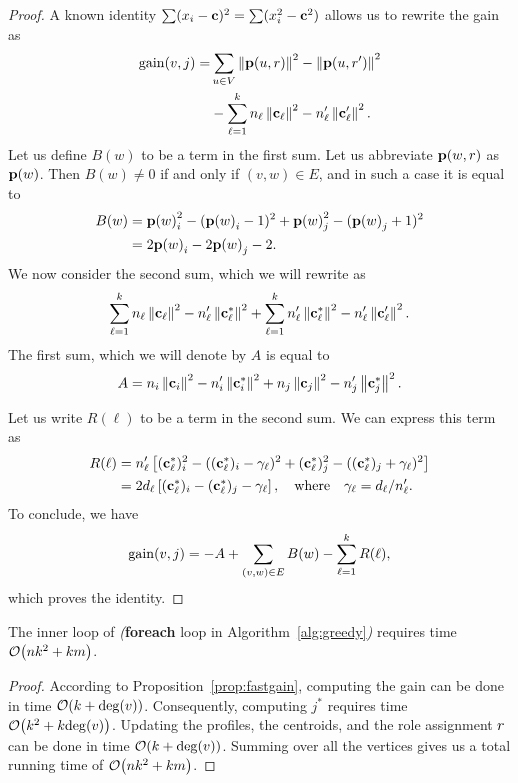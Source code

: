 \begin{proof}
A known identity $\sum (x_i - \mathbf{c})^2 = \sum (x_i^2 - \mathbf{c}^2)$ allows us to 
rewrite the gain as
\[
\begin{split}
	\gain{v, j} = & \sum_{u \in V} \norm{\prof{u, \role}}^2 -  \norm{\prof{u, \role'}}^2 \\
	& - \sum_{\ell = 1}^k n_\ell \norm{\centroid_\ell}^2 -  n_\ell' \norm{\centroid_\ell'}^2.
\end{split}
\]
Let us define $B(w)$ to be a term in the first sum.
Let us abbreviate $\prof{w, \role}$ as $\prof{w}$.
Then $B(w) \neq 0$ if and only if $(v, w) \in E$,
and in such a case it is equal to
\[
\begin{split}
	B(w) & = \prof{w}_i^2 - (\prof{w}_i - 1)^2 + \prof{w}_j^2 - (\prof{w}_j + 1)^2 \\
	& = 2\prof{w}_i - 2\prof{w}_j  - 2.
\end{split}
\]
We now consider the second sum, which we will rewrite as
\[
	\sum_{\ell = 1}^k n_\ell \left\|\mathbf{c}_\ell\right\|^2 -  n_\ell' \left\|\mathbf{c}_\ell^*\right\|^2 +
	\sum_{\ell = 1}^k n_\ell' \left\|\mathbf{c}_\ell^*\right\|^2 -  n_\ell' \left\|\mathbf{c}_\ell'\right\|^2.
\]
The first sum, which we will denote by $A$ is equal to
\[
	A = n_i\left\|\mathbf{c}_i\right\|^2 - n_i'\left\|\mathbf{c}_i^*\right\|^2 + n_j\left\|\mathbf{c}_j\right\|^2 - n_j'\left\|\mathbf{c}_j^*\right\|^2. 
\]

Let us write $R(\ell)$ to be a term in the second sum. We can express this term as
\[
\begin{split}
	R(\ell) & = n_\ell'\left[(\mathbf{c}_\ell^*)_i^2 - ((\mathbf{c}_\ell^*)_i - \gamma_\ell)^2 + (\mathbf{c}_\ell^*)_j^2 - ((\mathbf{c}_\ell^*)_j +  \gamma_\ell)^2\right] \\
	        & = 2d_\ell \left[(\mathbf{c}_\ell^*)_i - (\mathbf{c}_\ell^*)_j -  \gamma_\ell\right], \quad \text{where} \quad \gamma_\ell = d_\ell / n_\ell'.
\end{split}
\]
To conclude, we have
\[
	\gain{v, j} = - A + \sum_{(v, w) \in E} B(w) - \sum_{\ell = 1}^k R(\ell),
\]
which proves the identity.
\end{proof}



\begin{proposition}
The inner loop of \alggreedy
\emph{(}{\bf foreach} loop in Algorithm~\ref{alg:greedy}\emph{)} 
requires time $\bigO{nk^2 + km}$.
\end{proposition}

\begin{proof}
According to Proposition~\ref{prop:fastgain}, computing the gain can be done in time $\bigO{k + \dg{v}}$. 
Consequently, computing $j^*$ requires time $\bigO{k^2 + k\dg{v}}$. 
Updating the profiles, the centroids, and the role assignment $r$
can be done in time $\bigO{k + \dg{v}}$. 
Summing over all the vertices gives us a total running time of $\bigO{nk^2 + km}$.
\end{proof}

